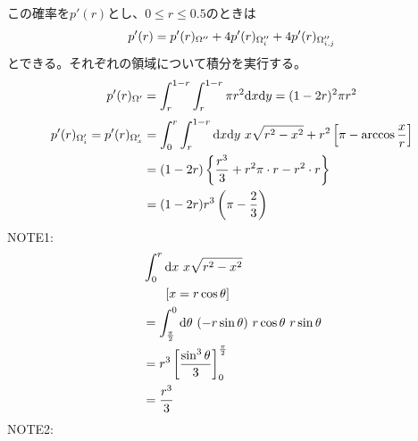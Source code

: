 \documentclass[letterpaper,10pt,english]{sphinxmanual}
\begin{document}
この確率を\(p'(r)\)とし、\(0\le r \le 0.5\)のときは
\begin{gather}
\begin{split}p'(r) = p'(r)_{\Omega''} + 4p'(r)_{\Omega''_{i}} + 4p'(r)_{\Omega''_{i,j}}\end{split}\notag
\end{gather}
とできる。それぞれの領域について積分を実行する。
\begin{gather}
\begin{split}p'(r)_{\Omega'} = \int_{r}^{1-r} \int_{r}^{1-r}\pi r^{2}\mathrm{d}x\mathrm{d}y = (1-2r)^{2}\pi r^{2}\end{split}\notag
\end{gather}\begin{gather}
\begin{split}\begin{align}
p'(r)_{\Omega'_{i}} = p'(r)_{\Omega'_{x}} &= \int_{0}^{r} \int_{r}^{1-r}\mathrm{d}x\mathrm{d}y\ x\sqrt{r^{2}-x^{2}} + r^{2}\left[\pi - \arccos\frac{x}{r}\right]\\
&= (1-2r)\left\{ \frac{r^{3}}{3} + r^{2}\pi\cdot r - r^{2}\cdot r \right\}\\
&= (1-2r)r^{3}\left( \pi-\frac{2}{3} \right)
\end{align}\end{split}\notag
\end{gather}
NOTE1:
\begin{gather}
\begin{split}\begin{align}
&\int_{0}^{r}\mathrm{d}x\ x\sqrt{r^{2}-x^{2}} \\
&\ \ \ \ \ \left[x = r\cos \theta \right]\\
&= \int_{\frac{\pi}{2}}^{0}\mathrm{d}\theta\ (-r\sin\theta)\ r\cos\theta\ r\sin\theta\\
&= r^{3}\left[ \frac{\sin^{3}\theta}{3}\right]^{\frac{\pi}{2}}_{0} \\
&= \frac{r^{3}}{3}
\end{align}\end{split}\notag
\end{gather}
NOTE2:
\end{document}
